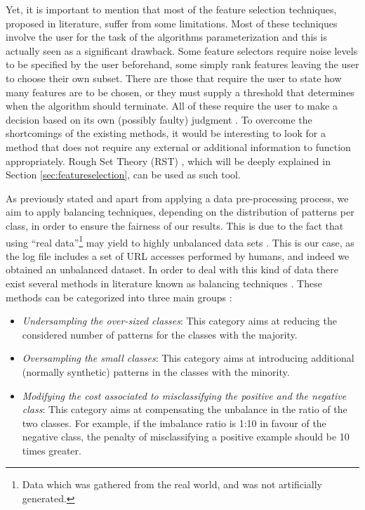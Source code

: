 \documentclass{llncs}
\begin{document}
Yet, it is important to mention that most of the feature selection techniques, proposed in literature, suffer from some limitations. Most of these techniques involve the user for the task of the algorithms parameterization and this is actually seen as a significant drawback. Some feature selectors require noise levels to be specified by the user beforehand, some simply rank features leaving the user to choose their own subset. There are those that require the user to state how many features are to be chosen, or they must supply a threshold that determines when the algorithm should terminate. All of these require the user to make a decision based on its own (possibly faulty) judgment \cite{jensen2005semantics}. To overcome the shortcomings of the existing methods, it would be interesting to look for a method that does not require any external or additional information to function appropriately. Rough Set Theory (RST) \cite{pawlak2008rough}, which will be deeply explained in Section \ref{sec:featureselection}, can be used as such tool. 
 
As previously stated and apart from applying a data pre-processing process, we aim to apply balancing techniques, depending on the distribution of patterns per class, in order to ensure the fairness of our results. This is due to the fact that using ``real data''\footnote{Data which was gathered from the real world, and was not artificially generated.} may yield to highly unbalanced data sets \cite{imbalanced_data_05}. This is our case, as the log file includes a set of URL accesses performed by humans, and indeed we obtained an unbalanced dataset. In order to deal with this kind of data there exist several methods in literature known as balancing techniques \cite{imbalanced_data_05}. These methods can be categorized into three main groups \cite{imbalance_techniques_02}: 

\begin{itemize}
\item \textit{Undersampling the over-sized classes}: This category aims at reducing the considered number of patterns for the classes with the majority.
\item \textit{Oversampling the small classes}: This category aims at introducing additional (normally synthetic) patterns in the classes with the minority.
\item \textit{Modifying the cost associated to misclassifying the positive and the negative class}: This category aims at compensating the unbalance in the ratio of the two classes. For example, if the imbalance ratio is 1:10 in favour of the negative class, the penalty of misclassifying a positive example should be 10 times greater.
\end{itemize}
\end{document}
